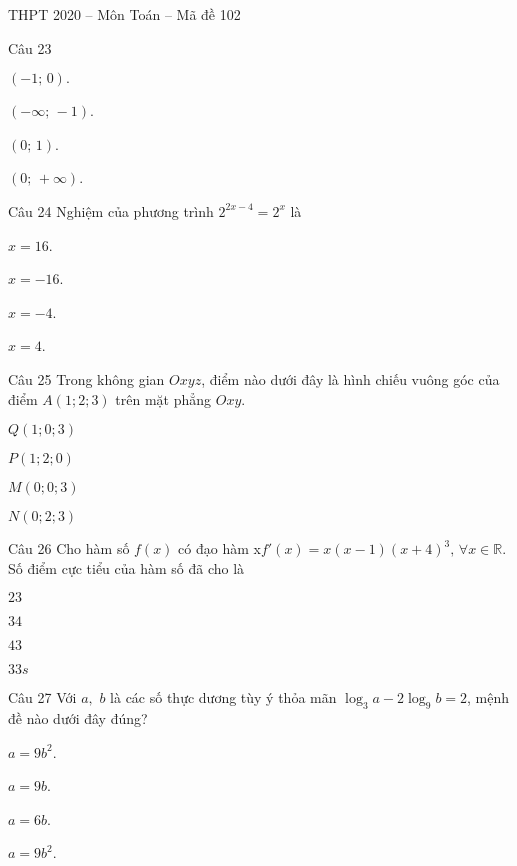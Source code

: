 \documentclass{book}
\begin{document}
\begin{quiz}{THPT 2020 – Môn Toán – Mã đề 102}
\begin{multi}[points=1]{Câu 23}
\item*  $\left( -1;\,0 \right).$	
\item  $\left( -\infty ;\,-1 \right)$.	
\item  $\left( 0;\,1 \right)$.	
\item  $\left( 0;\,+\infty  \right)$.
\end{multi}

\begin{multi}[points=1]{Câu 24}
 Nghiệm của phương trình ${{2}^{2x-4}}={{2}^{x}}$ là

\item  $x=16$.	
\item  $x=-16$.	
\item  $x=-4$.	
\item*  $x=4$.
\end{multi}

\begin{multi}[points=1]{Câu 25}
 Trong không gian $Oxyz$, điểm nào dưới đây là hình chiếu vuông góc của điểm $A\left( 1;2;3 \right)$ trên mặt phẳng $Oxy$.

\item  $Q\left( 1;0;3 \right)$	
\item*  $P\left( 1;2;0 \right)$	
\item  $M\left( 0;0;3 \right)$	
\item  $N\left( 0;2;3 \right)$
\end{multi}

\begin{multi}[points=1]{Câu 26}
 Cho hàm số $f\left( x \right)$ có đạo hàm x$f'\left( x \right)=x\left( x-1 \right){{\left( x+4 \right)}^{3}},\,\forall x\in \mathbb{R}$. Số điểm cực tiểu của hàm số đã cho là

\item*  	$23$
\item  	$34$
\item  	$43$
\item  $33s$
\end{multi}

\begin{multi}[points=1]{Câu 27}
 Với $a,\,\,b$ là các số thực dương tùy ý thỏa mãn ${{\log }_{3}}a-2{{\log }_{9}}b=2$, mệnh đề nào dưới đây đúng? 

\item  $a=9{{b}^{2}}$.	
\item*  $a=9b$.	
\item  $a=6b$.	
\item  $a=9{{b}^{2}}$.
\end{multi}


\end{quiz}
\end{document}
